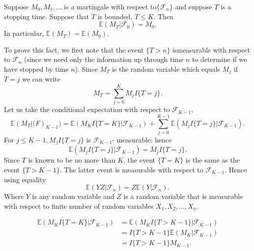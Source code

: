 \documentclass[a4paper,english,10pt]{article}
\begin{document}
\begin{thm} Suppose $M_0,M_1,\dots $ is a martingale with respect to$\{\mathcal{F}_n\}$ and suppose $T$ is a stopping time. Suppose that $T$ is bounded, $T\leq K$. Then
\begin{equation*}
\mathbb{E}(M_T|\mathcal{F}_0)=M_0.
\end{equation*}
In particular, $\mathbb{E}(M_T)=\mathbb{E}(M_0)$.
 \end{thm}
To prove this fact, we first note that the event $\{T>n\}$ ismeasurable with respect to $\mathcal{F}_n$ (since we need only the information up through time $n$ to determine if we have stopped by time $n$). Since $M_T$ is the random variable which equals $M_j$ if $T=j$ we can write
\begin{equation*}
M_T = \sum_{j=0}^K M_j I\{T=j\}.
\end{equation*}
Let us take the conditional expectation with respect to $\mathcal{F}_{K-1}$,
\begin{equation*}
\mathbb{E}(M_T|\mathcal(F)_{K-1})=\mathbb{E}(M_KI\{T=K\}|\mathcal{F}_{K-1})+\sum_{j=0}^{K-1} \mathbb{E}(M_jI\{T=j\}|\mathcal{F}_{K-1}).
\end{equation*}
For $j\leq K-1, M_jI\{T=j\}$ is $\mathcal{F}_{K-1}$- measurable; hence
\begin{equation*}
\mathbb{E}(M_jI\{T=j\}|\mathcal{F}_{K-1})=M_jI\{T=j\}.
\end{equation*}
Since $T$ is known to be no more than $K$, the event $\{T=K\}$ is the same as the event $\{T>K-1\}$. The latter event is measurable with respect to $\mathcal{F}_{K-1}$. Hence using equality
\begin{equation*}
\mathbb{E}(YZ|\mathcal{F}_n)= Z\mathbb{E}(Y|\mathcal{F}_n).
\end{equation*}
Where $Y$ is any random variable and $Z$ is a random variable that is measurable with respect to finite number of random variables $X_1,X_2,\dots,X_n$.

\begin{align*}
\mathbb{E}(M_KI\{T=K\}|\mathcal{F}_{K-1}) &=\mathbb{E}(M_KI\{T>K-1\}|\mathcal{F}_{K-1})\\
								   &=I\{T>K-1\}\mathbb{E}(M_K|\mathcal{F}_{K-1})\\
								   &=I\{T>K-1\}M_{K-1}.
\end{align*}
\end{document}
